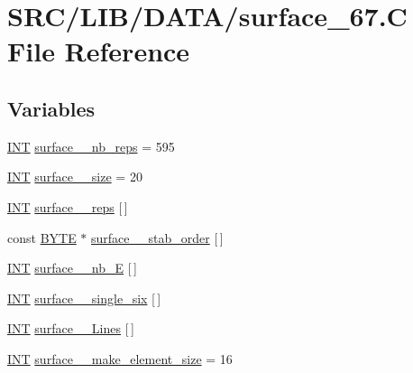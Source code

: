 \hypertarget{surface__67_8_c}{}\section{S\+R\+C/\+L\+I\+B/\+D\+A\+T\+A/surface\+\_\+67.C File Reference}
\label{surface__67_8_c}
\subsection*{Variables}
\begin{DoxyCompactItemize}
\item 
\mbox{\hyperlink{galois_8h_a09fddde158a3a20bd2dcadb609de11dc}{I\+NT}} \mbox{\hyperlink{surface__67_8_c_aba2766129a6fd100f9af2aec3429886f}{surface\+\_\+\_\+nb\+\_\+reps}} = 595
\item 
\mbox{\hyperlink{galois_8h_a09fddde158a3a20bd2dcadb609de11dc}{I\+NT}} \mbox{\hyperlink{surface__67_8_c_a3479f0a99dde727ab489afde61bcfb87}{surface\+\_\+\_\+size}} = 20
\item 
\mbox{\hyperlink{galois_8h_a09fddde158a3a20bd2dcadb609de11dc}{I\+NT}} \mbox{\hyperlink{surface__67_8_c_aaf83b619703cd40c6ccbd439ebc1bdf9}{surface\+\_\+\_\+reps}} \mbox{[}$\,$\mbox{]}
\item 
const \mbox{\hyperlink{galois_8h_ab6cc7b4aeb6ea31aba2b3fbfc83ff5e6}{B\+Y\+TE}} $\ast$ \mbox{\hyperlink{surface__67_8_c_a7e1c2fde85df55198a95994aed060e3d}{surface\+\_\+\_\+stab\+\_\+order}} \mbox{[}$\,$\mbox{]}
\item 
\mbox{\hyperlink{galois_8h_a09fddde158a3a20bd2dcadb609de11dc}{I\+NT}} \mbox{\hyperlink{surface__67_8_c_a74259b5c588fc3372fa16ca4f057097a}{surface\+\_\+\_\+nb\+\_\+E}} \mbox{[}$\,$\mbox{]}
\item 
\mbox{\hyperlink{galois_8h_a09fddde158a3a20bd2dcadb609de11dc}{I\+NT}} \mbox{\hyperlink{surface__67_8_c_a35b0161cb81bbcac21bcc860cf42ae35}{surface\+\_\+\_\+single\+\_\+six}} \mbox{[}$\,$\mbox{]}
\item 
\mbox{\hyperlink{galois_8h_a09fddde158a3a20bd2dcadb609de11dc}{I\+NT}} \mbox{\hyperlink{surface__67_8_c_ad37fe6f371f83d8faed46c30e2cd0131}{surface\+\_\+\_\+\+Lines}} \mbox{[}$\,$\mbox{]}
\item 
\mbox{\hyperlink{galois_8h_a09fddde158a3a20bd2dcadb609de11dc}{I\+NT}} \mbox{\hyperlink{surface__67_8_c_a25994953e06d522b4cde8b8dda6d08bd}{surface\+\_\+\_\+make\+\_\+element\+\_\+size}} = 16
\item 

\end{DoxyCompactItemize}
